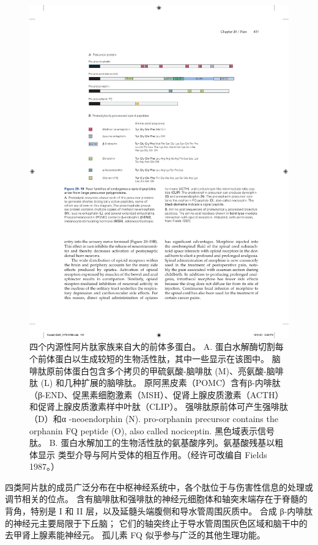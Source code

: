 \begin{figure}[htbp]
	\centering
	\includegraphics[width=1.0\linewidth]{chap20/fig_20_18}
	\caption{四个内源性阿片肽家族来自大的前体多蛋白。 
		A. 蛋白水解酶切割每个前体蛋白以生成较短的生物活性肽，其中一些显示在该图中。 
		脑啡肽原前体蛋白包含多个拷贝的甲硫氨酸-脑啡肽 (M)、亮氨酸-脑啡肽 (L) 和几种扩展的脑啡肽。 
		原阿黑皮素（POMC）含有β-内啡肽（β-END、促黑素细胞激素（MSH）、促肾上腺皮质激素（ACTH）和促肾上腺皮质激素样中叶肽（CLIP）。
		强啡肽原前体可产生强啡肽（D）和α -neoendorphin (N). pro-orphanin precursor contains the orphanin FQ peptide (O), also called nociceptin. 黑色域表示信号肽。
		B. 蛋白水解加工的生物活性肽的氨基酸序列。氨基酸残基以粗体显示 类型介导与阿片受体的相互作用。（经许可改编自 Fields 1987。）}
	\label{fig:20_18}
\end{figure}

四类阿片肽的成员广泛分布在中枢神经系统中，各个肽位于与伤害性信息的处理或调节相关的位点。 
含有脑啡肽和强啡肽的神经元细胞体和轴突末端存在于脊髓的背角，特别是 I 和 II 层，以及延髓头端腹侧和导水管周围灰质中。 
合成 β-内啡肽的神经元主要局限于下丘脑； 它们的轴突终止于导水管周围灰色区域和脑干中的去甲肾上腺素能神经元。 
孤儿素 FQ 似乎参与广泛的其他生理功能。


